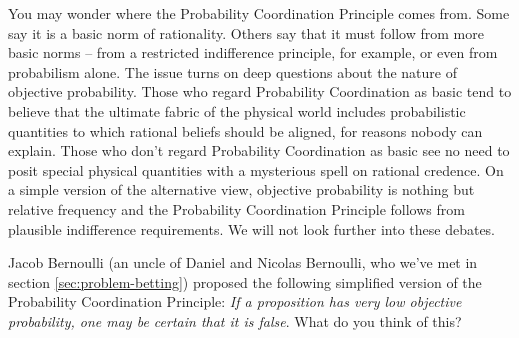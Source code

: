 
You may wonder where the Probability Coordination Principle comes from. Some say
it is a basic norm of rationality. Others say that it must follow from more
basic norms -- from a restricted indifference principle, for example, or even
from probabilism alone. The issue turns on deep questions about the nature of
objective probability. Those who regard Probability Coordination as basic tend
to believe that the ultimate fabric of the physical world includes probabilistic
quantities to which rational beliefs should be aligned, for reasons nobody can
explain. Those who don't regard Probability Coordination as basic see no need to
posit special physical quantities with a mysterious spell on rational credence.
On a simple version of the alternative view, objective probability is nothing
but relative frequency and the Probability Coordination Principle follows from
plausible indifference requirements. We will not look further into these
debates.





\begin{exercise}{1}
  Jacob Bernoulli (an uncle of Daniel and Nicolas Bernoulli, who we've met in
  section \ref{sec:problem-betting}) proposed the following simplified version
  of the Probability Coordination Principle: \emph{If a proposition has very low
    objective probability, one may be certain that it is false}. What do you
  think of this?
\end{exercise}

